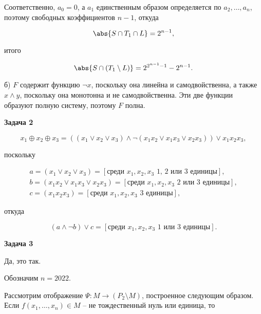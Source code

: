 		Соответственно, $a_0 = 0$, а $a_1$ единственным образом определяется по $a_2, \dots, a_n$, поэтому свободных коэффициентов $n - 1$, откуда

		\begin{equation*}
			\abs{S \cap T_1 \cap L} = 2^{n-1},
		\end{equation*}

		итого

		\begin{equation*}
			\abs{S \cap (T_1 \setminus L)} = 2^{2^{n-1}-1} - 2^{n-1}.
		\end{equation*}

		б) $F$ содержит функцию $\neg x$, поскольку она линейна и самодвойственна, а также $x \land y$, поскольку она монотонна и не самодвойственна. Эти две функции образуют полную систему, поэтому $F$ полна.


	\begin{center}
    \textbf{Задача 2}
\end{center}
		\begin{equation*}
			x_1 \oplus x_2 \oplus x_3 = ((x_1 \lor x_2 \lor x_3) \land \neg (x_1 x_2 \lor x_1 x_3 \lor x_2 x_3)) \lor x_1 x_2 x_3,
		\end{equation*}

		поскольку

		\begin{gather*}
			a = (x_1 \lor x_2 \lor x_3) = [\text{среди } x_1, x_2, x_3 \text{ 1, 2 или 3 единицы}], \\
			b = (x_1 x_2 \lor x_1 x_3 \lor x_2 x_3) = [\text{среди } x_1, x_2, x_3 \text{ 2 или 3 единицы}], \\
			c = (x_1 x_2 x_3) = [\text{среди } x_1, x_2, x_3 \text{ 3 единицы}],
		\end{gather*}

		откуда

		\begin{equation*}
			(a \land \neg b) \lor c = [\text{среди } x_1, x_2, x_3 \text{ 1 или 3 единицы}].
		\end{equation*}


	\begin{center}
    \textbf{Задача 3}
\end{center}
		Да, это так.

		Обозначим $n = 2022$.

		Рассмотрим отображение $\Psi: M \to (P_2 \setminus M)$, построенное следующим образом. Если $f(x_1, \dots, x_n) \in M$ -- не тождественный нуль или единица, то

